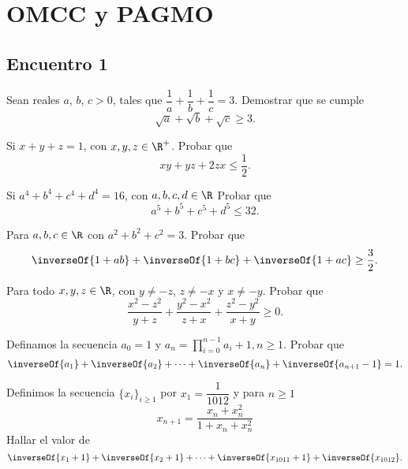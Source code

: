\section{OMCC y PAGMO}

\subsection{Encuentro 1}

\begin{section-problem}
    Sean reales $a$, $b$, $c > 0$, tales que $\dfrac{1}{a} + \dfrac{1}{b} + \dfrac{1}{c} = 3$.
    Demostrar que se cumple
    \[\sqrt {a} + \sqrt {b} + \sqrt {c} \geq 3.\]
\end{section-problem}

\begin{section-problem}
    Si $x + y + z = 1$, con $x, y, z \in \R^+$.
    Probar que
    \[xy + yz + 2zx \leq \frac{1}{2}.\]
\end{section-problem}

\begin{section-problem}
    Si $a^4 + b^4 + c^4 + d^4 = 16$, con $a, b, c, d \in \R$
    Probar que
    \[a^5 + b^5 + c^5 + d^5 \leq 32.\]
\end{section-problem}

\begin{section-problem}
    Para $a, b, c \in \R$ con $a^2 + b^2 + c^2 = 3$.
    Probar que
    \[\inverseOf{1 + ab} + \inverseOf{1 + bc} + \inverseOf{1 + ac} \geq \frac{3}{2}.\]
\end{section-problem}

\begin{section-problem}
    Para todo $x, y, z \in \R$, con $y \neq - z$, $z \neq - x$ y $x \neq - y$.
    Probar que
    \[\frac{x^2 - z^2}{y + z} + \frac{y^2 - x^2}{z + x} + \frac{z^2 - y^2}{x + y} \geq 0.\]
\end{section-problem}

\begin{section-problem}
    Definamos la secuencia $a_0 = 1$ y $a_n = \displaystyle\prod_{i = 0}^{n - 1} a_i + 1, n \geq 1$.
    Probar que
    \[\inverseOf{a_1} + \inverseOf{a_2} + \cdots + \inverseOf{a_n} + \inverseOf{a_{n + 1} - 1} = 1.\]
\end{section-problem}

\begin{section-problem}
    Definimos la secuencia $\{x_i\}_{i \geq 1}$ por $x_1 = \dfrac{1}{1012}$ y para $n \geq 1$
    \[x_{n + 1} = \frac{x_n + x_n^2}{1 + x_n + x_n^2}\]
    Hallar el valor de
    \[\inverseOf{x_1 + 1} + \inverseOf{x_2 + 1} + \cdots + \inverseOf{x_{1011} + 1} + \inverseOf{x_{1012}}.\]
\end{section-problem}

